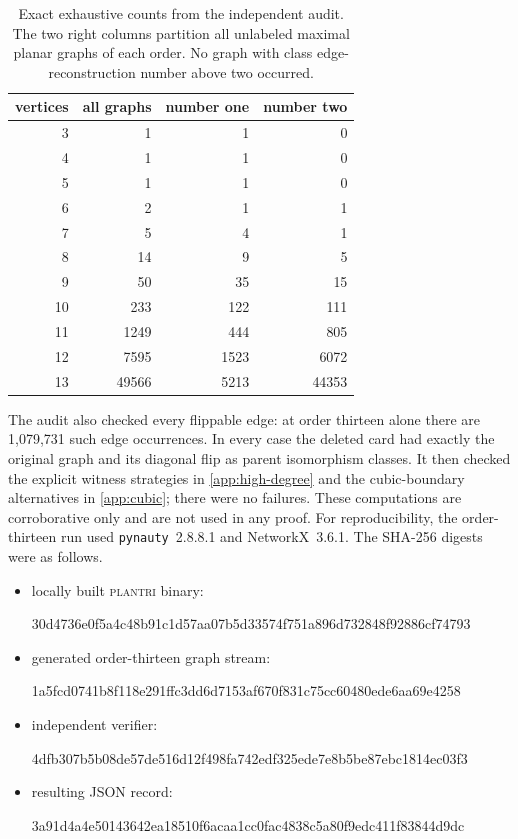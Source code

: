 \documentclass[11pt]{article}
\theoremstyle{definition}
\theoremstyle{remark}
\begin{document}
\begin{table}[ht]
\centering
\caption{Exact exhaustive counts from the independent audit.  The two right
columns partition all unlabeled maximal planar graphs of each order.  No
graph with class edge-reconstruction number above two occurred.}
\label{tab:enumeration}
\begin{tabular}{@{}rrrr@{}}
\toprule
vertices & all graphs & number one & number two\\
\midrule
3  & 1    & 1    & 0\\
4  & 1    & 1    & 0\\
5  & 1    & 1    & 0\\
6  & 2    & 1    & 1\\
7  & 5    & 4    & 1\\
8  & 14   & 9    & 5\\
9  & 50   & 35   & 15\\
10 & 233  & 122  & 111\\
11 & 1249 & 444  & 805\\
12 & 7595 & 1523 & 6072\\
13 & 49566 & 5213 & 44353\\
\bottomrule
\end{tabular}
\end{table}

The audit also checked every flippable edge: at order thirteen alone there are
1,079,731 such edge occurrences.  In every case the deleted card had exactly
the original graph and its diagonal flip as parent isomorphism classes.  It
then checked the explicit witness strategies in \cref{app:high-degree} and
the cubic-boundary alternatives in \cref{app:cubic}; there were no failures.
These computations are corroborative only and are not used in any proof.
For reproducibility, the order-thirteen run used \texttt{pynauty}~2.8.8.1
and NetworkX~3.6.1.  The SHA-256 digests were as follows.
\begin{itemize}[leftmargin=1.5em,itemsep=1pt,topsep=3pt]
\item locally built \textsc{plantri} binary:\par
  {\scriptsize\ttfamily
  30d4736e0f5a4c48b91c1d57aa07b5d33574f751a896d732848f92886cf74793}
\item generated order-thirteen graph stream:\par
  {\scriptsize\ttfamily
  1a5fcd0741b8f118e291ffc3dd6d7153af670f831c75cc60480ede6aa69e4258}
\item independent verifier:\par
  {\scriptsize\ttfamily
  4dfb307b5b08de57de516d12f498fa742edf325ede7e8b5be87ebc1814ec03f3}
\item resulting JSON record:\par
  {\scriptsize\ttfamily
  3a91d4a4e50143642ea18510f6acaa1cc0fac4838c5a80f9edc411f83844d9dc}
\end{itemize}
\end{document}
